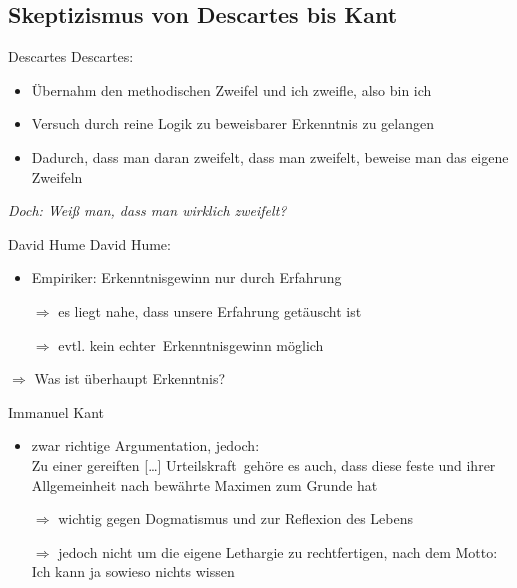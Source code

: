 \documentclass[12pt]{beamer}
\begin{document}
\subsection{Skeptizismus von Descartes bis Kant}
\begin{frame}{Descartes}
Descartes:
\begin{itemize}
\item Übernahm den methodischen Zweifel und  \glqq ich zweifle, also bin ich\grqq
\item Versuch durch reine Logik zu beweisbarer Erkenntnis zu gelangen
\item Dadurch, dass man daran zweifelt, dass man zweifelt, beweise man das eigene Zweifeln
\end{itemize}
\emph{Doch: Weiß man, dass man wirklich zweifelt?}
\end{frame}

\begin{frame}{David Hume}
David Hume:
\begin{itemize}
\item Empiriker: Erkenntnisgewinn nur durch Erfahrung
\item[$\Rightarrow$] es liegt nahe, dass unsere Erfahrung getäuscht ist
\item[$\Rightarrow$] evtl. kein \glqq echter\grqq\ Erkenntnisgewinn möglich
\end{itemize}
$\Rightarrow$ Was ist überhaupt \glqq Erkenntnis\grqq ?
\end{frame}

\begin{frame}{Immanuel Kant}
\begin{itemize}
\item zwar richtige Argumentation, jedoch:\\
Zu einer  \glqq gereiften [\ldots] Urteilskraft\grqq\ gehöre es auch, dass diese \glqq feste und ihrer Allgemeinheit nach bewährte Maximen zum Grunde hat\grqq\ %
\item[$\Rightarrow$] wichtig gegen Dogmatismus und zur Reflexion des Lebens
\item[$\Rightarrow$] jedoch nicht um die eigene Lethargie zu rechtfertigen, nach dem Motto:\\
\glqq Ich kann ja sowieso nichts wissen\grqq
\end{itemize}
\end{frame}
\end{document}

